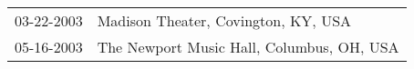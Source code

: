 \begin{supertabular}{ll}
 03-22-2003 &        Madison Theater, Covington, KY, USA \\
 05-16-2003 &  The Newport Music Hall, Columbus, OH, USA \\
\end{supertabular}
